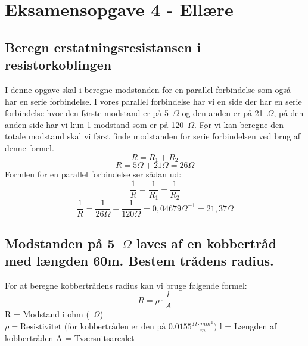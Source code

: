 \newpage
\section{Eksamensopgave 4 - Ellære}
\subsection{Beregn erstatningsresistansen i resistorkoblingen}
I denne opgave skal i beregne modstanden for en parallel forbindelse som også har en serie forbindelse. I vores parallel forbindelse har vi en side der har en serie forbindelse hvor den første modstand er på 5~$\Omega$ og den anden er på 21~$\Omega$, på den anden side har vi kun 1 modstand som er på 120~$\Omega$.\newline
Før vi kan beregne den totale modstand skal vi først finde modstanden for serie forbindelsen ved brug af denne formel.
\begin{equation*}
    R=R_{1}+R_{2}
\end{equation*}
\begin{equation*}
    R=5\Omega+21\Omega=26\Omega
\end{equation*}
Formlen for en parallel forbindelse ser sådan ud:
\begin{equation*}
    \frac{1}{R}=\frac{1}{R_{1}}+\frac{1}{R_{2}}
\end{equation*}
\begin{equation*}
    \frac{1}{R}=\frac{1}{26\Omega}+\frac{1}{120\Omega}=0,04679\Omega^{-1}=21,37\Omega
\end{equation*}

\subsection{Modstanden på 5~$\Omega$ laves af en kobbertråd med længden 60m. Bestem trådens radius.}
For at beregne kobbertrådens radius kan vi bruge følgende formel:
\begin{equation*}
    R=\rho\cdot\frac{l}{A}
\end{equation*}
R = Modstand i ohm (~$\Omega$)\newline
\begin{math}
    \rho = \text{Resistivitet (for kobbertråden er den på } 0.0155 \frac{\Omega \cdot mm^{2}}{m})
\end{math}\newline
l = Længden af kobbertråden\newline
A = Tværsnitsarealet\newline

